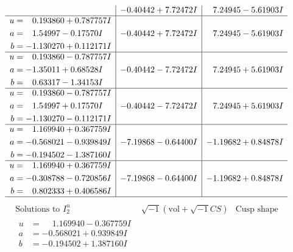 \documentclass[1p]{elsarticle_modified}
\theoremstyle{definition}
\newcommand{\I}{\sqrt{-1}}
\begin{document}
$$\begin{array}{c|c|c}
 & -0.40442 + 7.72472 I & \phantom{-}7.24945 - 5.61903 I \\ \hline\begin{aligned}
u &= \phantom{-}0.193860 + 0.787757 I \\
a &= \phantom{-}1.54997 - 0.17570 I \\
b &= -1.130270 + 0.112171 I\end{aligned}
 & -0.40442 + 7.72472 I & \phantom{-}7.24945 - 5.61903 I \\ \hline\begin{aligned}
u &= \phantom{-}0.193860 - 0.787757 I \\
a &= -1.35011 + 0.68528 I \\
b &= \phantom{-}0.63317 - 1.34153 I\end{aligned}
 & -0.40442 - 7.72472 I & \phantom{-}7.24945 + 5.61903 I \\ \hline\begin{aligned}
u &= \phantom{-}0.193860 - 0.787757 I \\
a &= \phantom{-}1.54997 + 0.17570 I \\
b &= -1.130270 - 0.112171 I\end{aligned}
 & -0.40442 - 7.72472 I & \phantom{-}7.24945 + 5.61903 I \\ \hline\begin{aligned}
u &= \phantom{-}1.169940 + 0.367759 I \\
a &= -0.568021 - 0.939849 I \\
b &= -0.194502 - 1.387160 I\end{aligned}
 & -7.19868 - 0.64400 I & -1.19682 + 0.84878 I \\ \hline\begin{aligned}
u &= \phantom{-}1.169940 + 0.367759 I \\
a &= -0.308788 - 0.720856 I \\
b &= \phantom{-}0.802333 + 0.406586 I\end{aligned}
 & -7.19868 - 0.64400 I & -1.19682 + 0.84878 I\\
 \hline 
 \end{array}$$\newpage$$\begin{array}{c|c|c}  
\text{Solutions to }I^u_{2}& \I (\text{vol} + \sqrt{-1}CS) & \text{Cusp shape}\\
 \hline 
\begin{aligned}
u &= \phantom{-}1.169940 - 0.367759 I \\
a &= -0.568021 + 0.939849 I \\
b &= -0.194502 + 1.387160 I\end{aligned}

\end{array}$$
\end{document}
